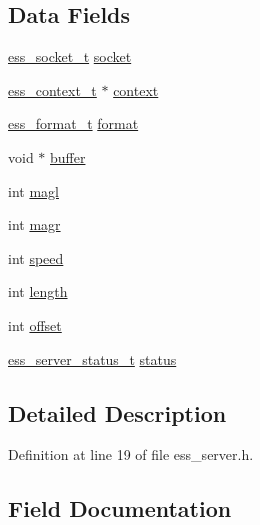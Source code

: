\subsection*{Data Fields}
\begin{DoxyCompactItemize}
\item 
\hyperlink{ess__socket_8h_ab7457db5cd500e7f0d74d0bc07356663}{ess\+\_\+socket\+\_\+t} \hyperlink{structess__server_ae1095210270047614ecdcf9d808e764c}{socket}
\item 
\hyperlink{ess__context_8h_a8a8fec5766c0b3615f8f12f7948e949b}{ess\+\_\+context\+\_\+t} $\ast$ \hyperlink{structess__server_ac7de255331395ee883c238e3fe9838a2}{context}
\item 
\hyperlink{ess__format_8h_a9aa23f58a25b9e8360c1400e0cadfd80}{ess\+\_\+format\+\_\+t} \hyperlink{structess__server_abb4395d1c05d3bbc2e1d011507ddd19b}{format}
\item 
void $\ast$ \hyperlink{structess__server_a368f7094dc38acca20612bbb392552f4}{buffer}
\item 
int \hyperlink{structess__server_a1aa199bcd52f6acf8edbf2ee6898a21b}{magl}
\item 
int \hyperlink{structess__server_a64b10d79850e935f9440886335b9f391}{magr}
\item 
int \hyperlink{structess__server_a218b4f7c6cc2681a99c23a3b089d68b1}{speed}
\item 
int \hyperlink{structess__server_a9f59b34b1f25fe00023291b678246bcc}{length}
\item 
int \hyperlink{structess__server_aed7ea92f45bd273dde380a45ddced592}{offset}
\item 
\hyperlink{ess__server_8h_a66019638fd44eba9d951ec93754c7b8d}{ess\+\_\+server\+\_\+status\+\_\+t} \hyperlink{structess__server_af34befa103928930a907b2eb5cc4739c}{status}
\end{DoxyCompactItemize}


\subsection{Detailed Description}


Definition at line 19 of file ess\+\_\+server.\+h.



\subsection{Field Documentation}
\mbox{\label{structess__server_a368f7094dc38acca20612bbb392552f4}} 
